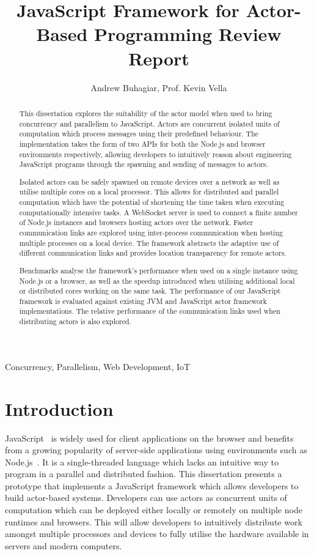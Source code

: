 \documentclass[lettersize,journal]{IEEEtran}
\begin{document}
\title{JavaScript Framework for Actor-Based Programming Review Report}
\author{Andrew Buhagiar, Prof. Kevin Vella}

\maketitle

\begin{abstract}
This dissertation explores the suitability of the actor model when used to bring concurrency and parallelism to JavaScript. Actors are concurrent isolated units of computation which process messages using their predefined behaviour. The implementation takes the form of two APIs for both the Node.js and browser environments respectively, allowing developers to intuitively reason about engineering JavaScript programs through the spawning and sending of messages to actors.

Isolated actors can be safely spawned on remote devices over a network as well as utilise multiple cores on a local processor. This allows for distributed and parallel computation which have the potential of shortening the time taken when executing computationally intensive tasks. A WebSocket server is used to connect a finite number of Node.js instances and browsers hosting actors over the network. Faster communication links are explored using inter-process communication when hosting multiple processes on a local device. The framework abstracts the adaptive use of different communication links and provides location transparency for remote actors.

Benchmarks analyse the framework's performance when used on a single instance using Node.js or a browser, as well as the speedup introduced when utilising additional local or distributed cores working on the same task. The performance of our JavaScript framework is evaluated against existing JVM and JavaScript actor framework implementations. The relative performance of the communication links used when distributing actors is also explored.
\end{abstract}

\begin{IEEEkeywords}
Concurrency, Parallelism, Web Development, IoT
\end{IEEEkeywords}

\section{Introduction}
JavaScript~\cite{ecmascript} is widely used for client applications on the browser and benefits from a growing popularity of server-side applications using environments such as Node.js~\cite{nodejs}. It is a single-threaded language which lacks an intuitive way to program in a parallel and distributed fashion. This dissertation presents a prototype that implements a JavaScript framework which allows developers to build actor-based systems. Developers can use actors as concurrent units of computation which can be deployed either locally or remotely on multiple node runtimes and browsers. This will allow developers to intuitively distribute work amongst multiple processors and devices to fully utilise the hardware available in servers and modern computers.
\end{document}
